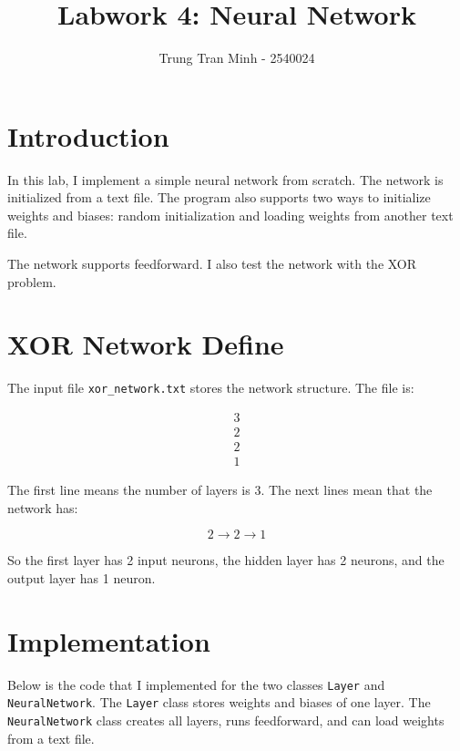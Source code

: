 \documentclass[12pt]{article}
\title{Labwork 4: Neural Network}
\author{Trung Tran Minh - 2540024}
\date{}
\begin{document}
\maketitle

\section{Introduction}

In this lab, I implement a simple neural network from scratch.
The network is initialized from a text file. The program also supports two ways to initialize weights and biases:
random initialization and loading weights from another text file.

The network supports feedforward. I also test the network with the XOR problem.

\section{XOR Network Define}

The input file \texttt{xor\_network.txt} stores the network structure.
The file is:

\[
\begin{array}{c}
3 \\
2 \\
2 \\
1
\end{array}
\]

The first line means the number of layers is 3.
The next lines mean that the network has:

\[
2 \rightarrow 2 \rightarrow 1
\]

So the first layer has 2 input neurons, the hidden layer has 2 neurons, and the output layer has 1 neuron.

\newpage
\section{Implementation}

Below is the code that I implemented for the two classes \texttt{Layer} and \texttt{NeuralNetwork}.
The \texttt{Layer} class stores weights and biases of one layer.
The \texttt{NeuralNetwork} class creates all layers, runs feedforward, and can load weights from a text file.
\end{document}
